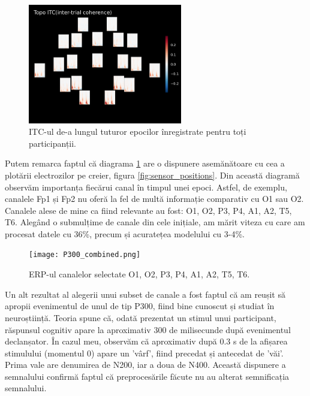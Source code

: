 \begin{figure}[H]
    \centering
		\vspace{-1em}
    \includegraphics[width=0.6\textwidth]{images/itc_epochs.png}
    \caption{ITC-ul de-a lungul tuturor epocilor înregistrate pentru toți participanții.}
		\vspace{-1em}
    \label{fig:itc}
\end{figure}

Putem remarca faptul că diagrama \ref{fig:itc} are o dispunere asemănătoare cu cea a plotării electrozilor pe creier, figura \ref{fig:sensor_positions}. Din această diagramă observăm importanța fiecărui canal în timpul unei epoci. Astfel, de exemplu, canalele Fp1 și Fp2 nu oferă la fel de multă informație comparativ cu O1 sau O2. Canalele alese de mine ca fiind relevante au fost: O1, O2, P3, P4, A1, A2, T5, T6. Alegând o submulțime de canale din cele inițiale, am mărit viteza cu care am procesat datele cu 36\%, precum și acuratețea modelului cu 3-4\%.

\vspace{1em}
\begin{figure}[H]
    \centering
		\vspace{-1em}
    \texttt{[image: P300\_combined.png]}
    \caption{ERP-ul canalelor selectate O1, O2, P3, P4, A1, A2, T5, T6.}
		\vspace{-1em}
    \label{fig:enter-label}
\end{figure}

Un alt rezultat al alegerii unui subset de canale a fost faptul că am reușit să apropii evenimentul de unul de tip P300\cite{P300}, fiind bine cunoscut și studiat în neuroștiință. Teoria spune că, odată prezentat un stimul unui participant, răspunsul cognitiv apare la aproximativ 300 de milisecunde după evenimentul declanșator. În cazul meu, observăm că aproximativ după 0.3 s de la afișarea stimulului (momentul 0) apare un 'vârf', fiind precedat și antecedat de 'văi'. Prima vale are denumirea de N200, iar a doua de N400. Această dispunere a semnalului confirmă faptul că preprocesările făcute nu au alterat semnificația semnalului. %

